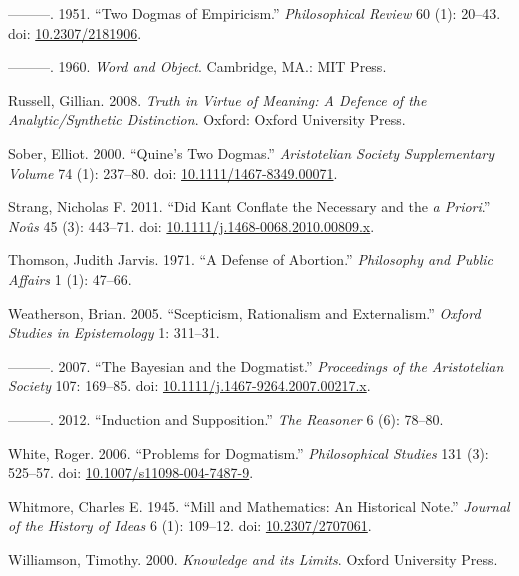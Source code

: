 \documentclass[
  10pt,
  letterpaper,
  DIV=11,
  numbers=noendperiod,
  twoside]{scrartcl}
\newlength{\cslhangindent}
\newenvironment{CSLReferences}[2] %
 {\begin{list}{}{%
  \setlength{\itemindent}{0pt}
  \setlength{\leftmargin}{0pt}
  \setlength{\parsep}{0pt}
  \ifodd #1
   \setlength{\leftmargin}{\cslhangindent}
   \setlength{\itemindent}{-1\cslhangindent}
  \fi
  \setlength{\itemsep}{#2\baselineskip}}}
 {\end{list}}
\begin{document}
\begin{CSLReferences}{1}{0}
---------. 1951. {``Two Dogmas of Empiricism.''} \emph{Philosophical
Review} 60 (1): 20--43. doi:
\href{https://doi.org/10.2307/2181906}{10.2307/2181906}.

---------. 1960. \emph{Word and Object}. Cambridge, MA.: MIT Press.

Russell, Gillian. 2008. \emph{Truth in Virtue of Meaning: A Defence of
the Analytic/Synthetic Distinction}. Oxford: Oxford University Press.

Sober, Elliot. 2000. {``Quine's Two Dogmas.''} \emph{Aristotelian
Society Supplementary Volume} 74 (1): 237--80. doi:
\href{https://doi.org/10.1111/1467-8349.00071}{10.1111/1467-8349.00071}.

Strang, Nicholas F. 2011. {``Did Kant Conflate the Necessary and the
\emph{a Priori}.''} \emph{No{û}s} 45 (3): 443--71. doi:
\href{https://doi.org/10.1111/j.1468-0068.2010.00809.x}{10.1111/j.1468-0068.2010.00809.x}.

Thomson, Judith Jarvis. 1971. {``A Defense of Abortion.''}
\emph{Philosophy and Public Affairs} 1 (1): 47--66.

Weatherson, Brian. 2005. {``Scepticism, Rationalism and Externalism.''}
\emph{Oxford Studies in Epistemology} 1: 311--31.

---------. 2007. {``The Bayesian and the Dogmatist.''} \emph{Proceedings
of the Aristotelian Society} 107: 169--85. doi:
\href{https://doi.org/10.1111/j.1467-9264.2007.00217.x}{10.1111/j.1467-9264.2007.00217.x}.

---------. 2012. {``Induction and Supposition.''} \emph{The Reasoner} 6
(6): 78--80.

White, Roger. 2006. {``Problems for Dogmatism.''} \emph{Philosophical
Studies} 131 (3): 525--57. doi:
\href{https://doi.org/10.1007/s11098-004-7487-9}{10.1007/s11098-004-7487-9}.

Whitmore, Charles E. 1945. {``Mill and Mathematics: An Historical
Note.''} \emph{Journal of the History of Ideas} 6 (1): 109--12. doi:
\href{https://doi.org/10.2307/2707061}{10.2307/2707061}.

Williamson, Timothy. 2000. \emph{{Knowledge and its Limits}}. Oxford
University Press.


\end{CSLReferences}
\end{document}
